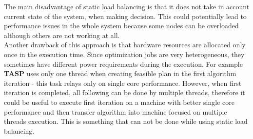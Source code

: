 The main disadvantage of static load balancing is that it does not take in account current state of the system,
when making decision.
This could potentially lead to performance issues in the whole system because some nodes can be overloaded although others are not working at all.\\
Another drawback of this approach is that hardware resources are allocated only once in the execution time.
Since optimization jobs are very heterogeneous, they sometimes have different power requirements during the execution.
For example \textbf{TASP} uses only one thread when creating feasible plan in the first algorithm iteration -
this task relays only on single core performance.
However, when first iteration is completed, all following can be done by multiple threads,
therefore it could be useful to execute first iteration on a machine with better single core performance
and then transfer algorithm into machine focused on multiple threads execution.
This is something that can not be done while using static load balancing.

